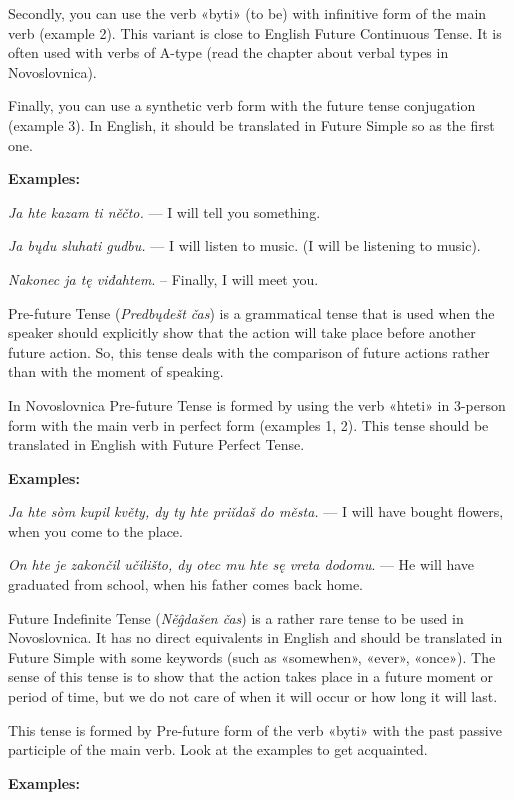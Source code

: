 Secondly, you can use the verb «byti» (to be) with infinitive form of the main verb (example 2). This variant is close to English Future Continuous Tense. It is often used with verbs of A-type (read the chapter about verbal types in Novoslovnica).

Finally, you can use a synthetic verb form with the future tense conjugation (example 3). In English, it should be translated in Future Simple so as the first one.

\textbf{Examples:}

\textit{Ja hte kazam ti něčto.} — I will tell you something.

\textit{Ja bųdu sluhati gudbu.} — I will listen to music. (I will be listening to music).

\textit{Nakonec ja tę viđahtem}. – Finally, I will meet you.

Pre-future Tense (\textit{Predbųdešt čas}) is a grammatical tense that is used when the speaker should explicitly show that the action will take place before another future action. So, this tense deals with the comparison of future actions rather than with the moment of speaking.

In Novoslovnica Pre-future Tense is formed by using the verb «hteti» in 3-person form with the main verb in perfect form (examples 1, 2). This tense should be translated in English with Future Perfect Tense.

\textbf{Examples:}

\textit{Ja hte sòm kupil květy, dy ty hte priǐdaš do města.} — I will have bought flowers, when you come to the place.

\textit{On hte je zakončil učilišto, dy otec mu hte sę vreta dodomu}. — He will have graduated from school, when his father comes back home.

Future Indefinite Tense (\textit{Něĝdašen čas}) is a rather rare tense to be used in Novoslovnica. It has no direct equivalents in English and should be translated in Future Simple with some keywords (such as «somewhen», «ever», «once»). The sense of this tense is to show that the action takes place in a future moment or period of time, but we do not care of when it will occur or how long it will last.

This tense is formed by Pre-future form of the verb «byti» with the past passive participle of the main verb. Look at the examples to get acquainted.

\textbf{Examples:}

